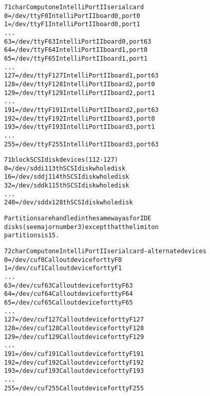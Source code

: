 \documentclass[a4paper,8pt,english]{sphinxmanual}
\begin{document}
\begin{alltt}
  71 char       Computone IntelliPort II serial card
                  0 = /dev/ttyF0        IntelliPort II board 0, port 0
                  1 = /dev/ttyF1        IntelliPort II board 0, port 1
                    ...
                 63 = /dev/ttyF63       IntelliPort II board 0, port 63
                 64 = /dev/ttyF64       IntelliPort II board 1, port 0
                 65 = /dev/ttyF65       IntelliPort II board 1, port 1
                    ...
                127 = /dev/ttyF127      IntelliPort II board 1, port 63
                128 = /dev/ttyF128      IntelliPort II board 2, port 0
                129 = /dev/ttyF129      IntelliPort II board 2, port 1
                    ...
                191 = /dev/ttyF191      IntelliPort II board 2, port 63
                192 = /dev/ttyF192      IntelliPort II board 3, port 0
                193 = /dev/ttyF193      IntelliPort II board 3, port 1
                    ...
                255 = /dev/ttyF255      IntelliPort II board 3, port 63

  71 block      SCSI disk devices (112-127)
                  0 = /dev/sddi         113th SCSI disk whole disk
                 16 = /dev/sddj         114th SCSI disk whole disk
                 32 = /dev/sddk         115th SCSI disk whole disk
                    ...
                240 = /dev/sddx         128th SCSI disk whole disk

                Partitions are handled in the same way as for IDE
                disks (see major number 3) except that the limit on
                partitions is 15.

  72 char       Computone IntelliPort II serial card - alternate devices
                  0 = /dev/cuf0         Callout device for ttyF0
                  1 = /dev/cuf1         Callout device for ttyF1
                    ...
                 63 = /dev/cuf63        Callout device for ttyF63
                 64 = /dev/cuf64        Callout device for ttyF64
                 65 = /dev/cuf65        Callout device for ttyF65
                    ...
                127 = /dev/cuf127       Callout device for ttyF127
                128 = /dev/cuf128       Callout device for ttyF128
                129 = /dev/cuf129       Callout device for ttyF129
                    ...
                191 = /dev/cuf191       Callout device for ttyF191
                192 = /dev/cuf192       Callout device for ttyF192
                193 = /dev/cuf193       Callout device for ttyF193
                    ...
                255 = /dev/cuf255       Callout device for ttyF255


\end{alltt}
\end{document}

